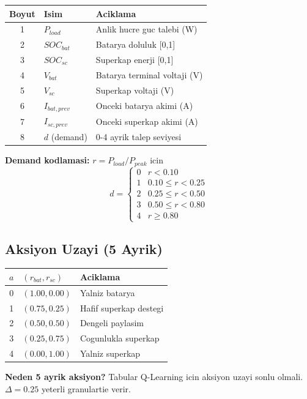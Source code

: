 \documentclass[11pt,a4paper]{article}
\begin{document}
\begin{center}
\begin{tabular}{cll}
\toprule
Boyut & Isim & Aciklama \\
\midrule
1 & $P_{load}$ & Anlik hucre guc talebi (W) \\
2 & $SOC_{bat}$ & Batarya doluluk [0,1] \\
3 & $SOC_{sc}$ & Superkap enerji [0,1] \\
4 & $V_{bat}$ & Batarya terminal voltaji (V) \\
5 & $V_{sc}$ & Superkap voltaji (V) \\
6 & $I_{bat,prev}$ & Onceki batarya akimi (A) \\
7 & $I_{sc,prev}$ & Onceki superkap akimi (A) \\
8 & $d$ (demand) & 0-4 ayrik talep seviyesi \\
\bottomrule
\end{tabular}
\end{center}

\textbf{Demand kodlamasi:} $r = P_{load}/P_{peak}$ icin
\[
d = \begin{cases}
0 & r < 0.10 \\
1 & 0.10 \leq r < 0.25 \\
2 & 0.25 \leq r < 0.50 \\
3 & 0.50 \leq r < 0.80 \\
4 & r \geq 0.80
\end{cases}
\]

\subsection{Aksiyon Uzayi (5 Ayrik)}

\begin{center}
\begin{tabular}{cll}
\toprule
$a$ & $(r_{bat}, r_{sc})$ & Aciklama \\
\midrule
0 & $(1.00, 0.00)$ & Yalniz batarya \\
1 & $(0.75, 0.25)$ & Hafif superkap destegi \\
2 & $(0.50, 0.50)$ & Dengeli paylasim \\
3 & $(0.25, 0.75)$ & Cogunlukla superkap \\
4 & $(0.00, 1.00)$ & Yalniz superkap \\
\bottomrule
\end{tabular}
\end{center}

\begin{whybox}
\textbf{Neden 5 ayrik aksiyon?} Tabular Q-Learning icin aksiyon uzayi sonlu olmali. $\Delta = 0.25$ yeterli granulartie verir.
\end{whybox}
\end{document}

